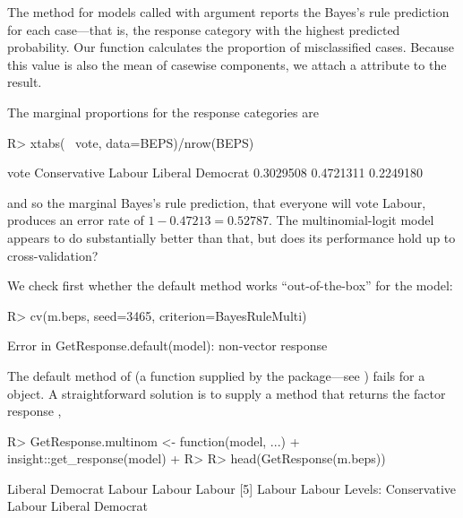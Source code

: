 \documentclass[
]{jss}
\begin{document}
The  method for  models called with
argument  reports the Bayes's rule prediction for
each case---that is, the response category with the highest predicted
probability. Our  function calculates the
proportion of misclassified cases. Because this value is also the mean
of casewise components, we attach a  attribute to
the result.

The marginal proportions for the response categories are

\begin{CodeChunk}
\begin{CodeInput}
R> xtabs(~ vote, data=BEPS)/nrow(BEPS)
\end{CodeInput}
\begin{CodeOutput}
vote
    Conservative           Labour Liberal Democrat 
       0.3029508        0.4721311        0.2249180 
\end{CodeOutput}
\end{CodeChunk}

and so the marginal Bayes's rule prediction, that everyone will vote
Labour, produces an error rate of \(1 - 0.47213 = 0.52787\). The
multinomial-logit model appears to do substantially better than that,
but does its performance hold up to cross-validation?

We check first whether the default  method works
``out-of-the-box'' for the  model:

\begin{CodeChunk}
\begin{CodeInput}
R> cv(m.beps, seed=3465, criterion=BayesRuleMulti)
\end{CodeInput}
\begin{CodeOutput}
Error in GetResponse.default(model): non-vector response
\end{CodeOutput}
\end{CodeChunk}

The default method of  (a function supplied by the
 package---see ) fails for a
 object. A straightforward solution is to supply a
 method that returns the factor response
\citep[using the \texttt{get\_response()} function from the
 package,][]{LudeckeWaggonerMakowski:2019},

\begin{CodeChunk}
\begin{CodeInput}
R> GetResponse.multinom <- function(model, ...) {
+   insight::get_response(model)
+ }
R> 
R> head(GetResponse(m.beps))
\end{CodeInput}
\begin{CodeOutput}
[1] Liberal Democrat Labour           Labour           Labour          
[5] Labour           Labour          
Levels: Conservative Labour Liberal Democrat
\end{CodeOutput}
\end{CodeChunk}
\end{document}
